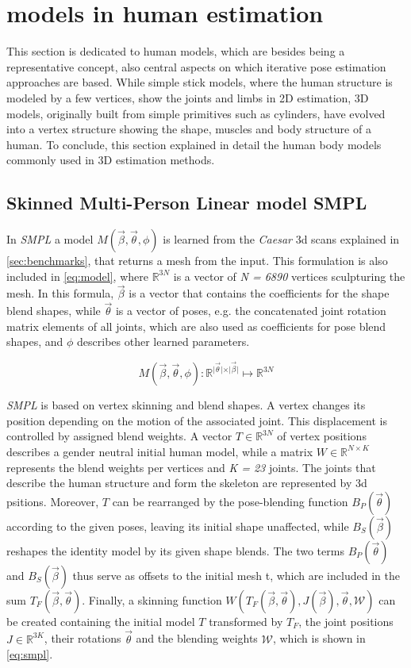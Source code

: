 \section{models in human estimation}
This section is dedicated to human models, which are besides being a representative concept, also central aspects on which iterative pose estimation approaches are based. While simple stick models, where the human structure is modeled by a few vertices, show the joints and limbs in 2D estimation, 3D models, originally built from simple primitives such as cylinders, have evolved into a vertex structure showing the shape, muscles and body structure of a human. To conclude, this section explained in detail the human body models commonly used in 3D estimation methods.

\subsection{Skinned Multi-Person Linear model SMPL}
\label{sec:SMPL}
In \emph{SMPL} \cite{smpl} a model $M(\vec{\beta},\vec{\theta},\phi)$ is learned from the \emph{Caesar} 3d scans explained in \autoref{sec:benchmarks}, that returns a mesh from the input. This formulation is also included in \autoref{eq:model}, where $\mathbb{R}^{3N}$ is a vector of \emph{N = 6890} vertices sculpturing the mesh. In this formula, $\vec{\beta}$ is a vector that contains the coefficients for the shape blend shapes, while $\vec{\theta}$ is a vector of poses, e.g. the concatenated joint rotation matrix elements of all joints, which are also used as coefficients for pose blend shapes, and $\phi$ describes other learned parameters.

\begin{equation}
\label{eq:model}
M(\vec{\beta},\vec{\theta},\phi) : \mathbb{R}^{\vert \vec{\theta} \vert \times \vert \vec{\beta} \vert} \mapsto \mathbb{R}^{3N}
\end{equation}

\emph{SMPL} is based on vertex skinning and blend shapes. A vertex changes its position depending on the motion of the associated joint. This displacement is controlled by assigned blend weights. A vector $T \in \mathbb{R}^{3N}$ of vertex positions describes a gender neutral initial human model, while a matrix $W \in \mathbb{R}^{N \times K}$ represents the blend weights per vertices and \emph{K = 23} joints. The joints that describe the human structure and form the skeleton are represented by 3d psitions. Moreover, $T$ can be rearranged by the pose-blending function $B_{P}(\vec{\theta})$ according to the given poses, leaving its initial shape unaffected, while $B_{S}(\vec{\beta})$ reshapes the identity model by its given shape blends. The two terms $B_{P}(\vec{\theta})$ and $B_{S}(\vec{\beta})$ thus serve as offsets to the initial mesh t, which are included in the sum $T_{F}(\vec{\beta},\vec{\theta})$. Finally, a skinning function $W(T_{F}(\vec{\beta},\vec{\theta}),J(\vec{\beta}),\vec{\theta},\mathcal{W})$ can be created containing the initial model $T$ transformed by $T_{F}$, the joint positions $J \in \mathbb{R}^{3K}$, their rotations $\vec{\theta}$ and the blending weights $\mathcal{W}$, which is shown in \autoref{eq:smpl}.

